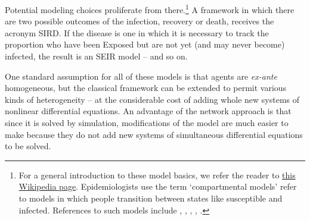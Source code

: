 Potential modeling choices proliferate from there.\footnote{For a general introduction to these model basics, we refer the reader to \href{https://en.wikipedia.org/wiki/Compartmental_models_in_epidemiology\#Transition_rates}{this Wikipedia page}. Epidemiologists use the term `compartmental models' refer to models in which people transition between states like susceptible and infected.  References to such models include	 \href{https://royalsocietypublishing.org/doi/10.1098/rspa.1927.0118}{\cite{kermack_contribution_1927}},  \href{https://www.ncbi.nlm.nih.gov/pmc/articles/PMC3710332/}{\cite{bailey1975mathematical}}, \href{https://www.amazon.com/Infectious-Diseases-Humans-Dynamics-Control/dp/019854040X}{\cite{anderson_infectious_1992}}, \href{https://epubs.siam.org/doi/abs/10.1137/S0036144500371907}{\cite{hethcote_mathematics_2000}}, \href{https://www.ncbi.nlm.nih.gov/pmc/articles/PMC6001967/}{\cite{brauer2017mathematical}}.}  A framework in which there are two possible outcomes of the infection, recovery or death, receives the acronym SIRD.  If the disease is one in which it is necessary to track the proportion who have been Exposed but are not yet (and may never become) infected, the result is an SEIR model -- and so on.


One standard assumption for all of these models is that agents are \textit{ex-ante} homogeneous, but the classical framework can be extended to permit various kinds of heterogeneity -- at the considerable cost of adding whole new systems of nonlinear differential equations.  An advantage of the network approach is that since it is solved by simulation, modifications of the model are much easier to make because they do not add new systems of simultaneous differential equations to be solved.




